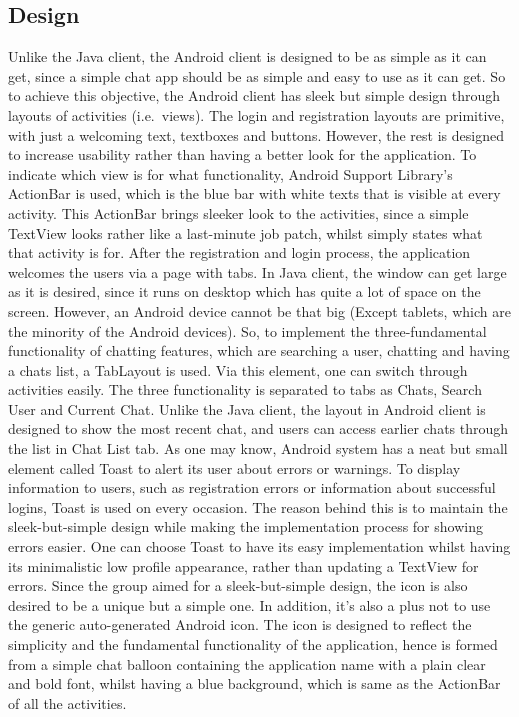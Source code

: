 \documentclass[11pt,a4paper]{report}
\begin{document}
\subsection{Design}
Unlike the Java client, the Android client is designed to be as simple as it can get, since a simple chat app should be as simple and easy to use as it can get. So to achieve this objective, the Android client has sleek but simple design through layouts of activities (i.e.\ views).
The login and registration layouts are primitive, with just a welcoming text, textboxes and buttons. However, the rest is designed to increase usability rather than having a better look for the application.
To indicate which view is for what functionality, Android Support Library’s ActionBar is used, which is the blue bar with white texts that is visible at every activity. This ActionBar brings sleeker look to the activities, since a simple TextView looks rather like a last-minute job patch, whilst simply states what that activity is for.
After the registration and login process, the application welcomes the users via a page with tabs. In Java client, the window can get large as it is desired, since it runs on desktop which has quite a lot of space on the screen. However, an Android device cannot be that big (Except tablets, which are the minority of the Android devices). So, to implement the three-fundamental functionality of chatting features, which are searching a user, chatting and having a chats list, a TabLayout is used. Via this element, one can switch through activities easily. The three functionality is separated to tabs as Chats, Search User and Current Chat. Unlike the Java client, the layout in Android client is designed to show the most recent chat, and users can access earlier chats through the list in Chat List tab.
As one may know, Android system has a neat but small element called Toast to alert its user about errors or warnings. To display information to users, such as registration errors or information about successful logins, Toast is used on every occasion. The reason behind this is to maintain the sleek-but-simple design while making the implementation process for showing errors easier. One can choose Toast to have its easy implementation whilst having its minimalistic low profile appearance, rather than updating a TextView for errors.
Since the group aimed for a sleek-but-simple design, the icon is also desired to be a unique but a simple one. In addition, it’s also a plus not to use the generic auto-generated Android icon. The icon is designed to reflect the simplicity and the fundamental functionality of the application, hence is formed from a simple chat balloon containing the application name with a plain clear and bold font, whilst having a blue background, which is same as the ActionBar of all the activities.
\end{document}

